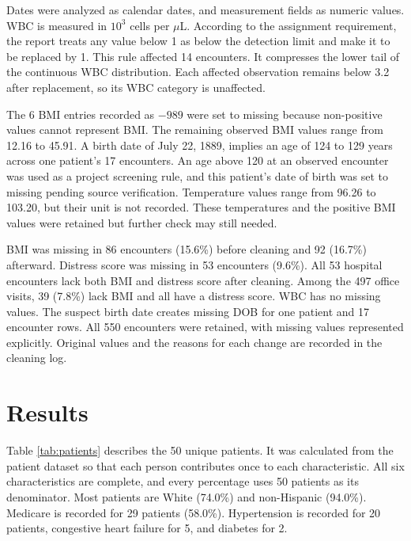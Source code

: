 \documentclass[11pt,letterpaper]{article}
\begin{document}
Dates were analyzed as calendar dates, and measurement fields as numeric
values. WBC is measured in \(10^3\) cells per \(\mu\)L. According to the
assignment requirement, the report treats any value below 1 as below the
detection limit and make it to be replaced by 1. This rule affected 14
encounters. It compresses the lower tail of the continuous WBC
distribution. Each affected observation remains below 3.2 after
replacement, so its WBC category is unaffected.

The 6 BMI entries recorded as \(-989\) were set to missing because
non-positive values cannot represent BMI. The remaining observed BMI
values range from 12.16 to 45.91. A birth date of July 22, 1889, implies
an age of 124 to 129 years across one patient's 17 encounters. An age
above 120 at an observed encounter was used as a project screening rule,
and this patient's date of birth was set to missing pending source
verification. Temperature values range from 96.26 to 103.20, but their
unit is not recorded. These temperatures and the positive BMI values
were retained but further check may still needed.

BMI was missing in 86 encounters (15.6\%) before cleaning and 92
(16.7\%) afterward. Distress score was missing in 53 encounters (9.6\%).
All 53 hospital encounters lack both BMI and distress score after
cleaning. Among the 497 office visits, 39 (7.8\%) lack BMI and all have
a distress score. WBC has no missing values. The suspect birth date
creates missing DOB for one patient and 17 encounter rows. All 550
encounters were retained, with missing values represented explicitly.
Original values and the reasons for each change are recorded in the
cleaning log.

\section{Results}\label{results}

Table \ref{tab:patients} describes the 50 unique patients. It was
calculated from the patient dataset so that each person contributes once
to each characteristic. All six characteristics are complete, and every
percentage uses 50 patients as its denominator. Most patients are White
(74.0\%) and non-Hispanic (94.0\%). Medicare is recorded for 29 patients
(58.0\%). Hypertension is recorded for 20 patients, congestive heart
failure for 5, and diabetes for 2.
\end{document}
